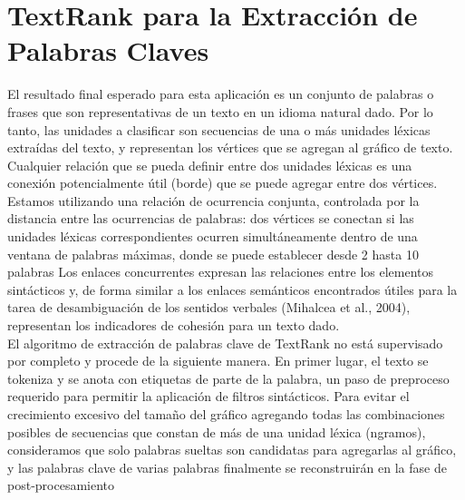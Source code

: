 \documentclass[conference]{IEEEtran}
\begin{document}
\section{TextRank para la Extracción de Palabras Claves }
El resultado final esperado para esta aplicación es un conjunto de palabras o frases que son representativas de un texto en un idioma natural dado. Por lo tanto, las unidades a clasificar son secuencias de una o más unidades léxicas extraídas del texto, y representan los vértices que se agregan al gráfico de texto. Cualquier relación que se pueda definir entre dos unidades léxicas es una conexión potencialmente útil (borde) que se puede agregar entre dos vértices. Estamos utilizando una relación de ocurrencia conjunta, controlada por la distancia entre las ocurrencias de palabras: dos vértices se conectan si las unidades léxicas correspondientes ocurren simultáneamente dentro de una ventana de palabras máximas, donde se puede establecer desde 2 hasta 10 palabras Los enlaces concurrentes expresan las relaciones entre los elementos sintácticos y, de forma similar a los enlaces semánticos encontrados útiles para la tarea de desambiguación de los sentidos verbales (Mihalcea et al., 2004), representan los indicadores de cohesión para un texto dado.\\
El algoritmo de extracción de palabras clave de TextRank no está supervisado por completo y procede de la siguiente manera. En primer lugar, el texto se tokeniza y se anota con etiquetas de parte de la palabra, un paso de preproceso requerido para permitir la aplicación de filtros sintácticos. Para evitar el crecimiento excesivo del tamaño del gráfico agregando todas las combinaciones posibles de secuencias que constan de más de una unidad léxica (ngramos), consideramos que solo palabras sueltas son candidatas para agregarlas al gráfico, y las palabras clave de varias palabras finalmente se reconstruirán en la fase de post-procesamiento	\\
\end{document}
